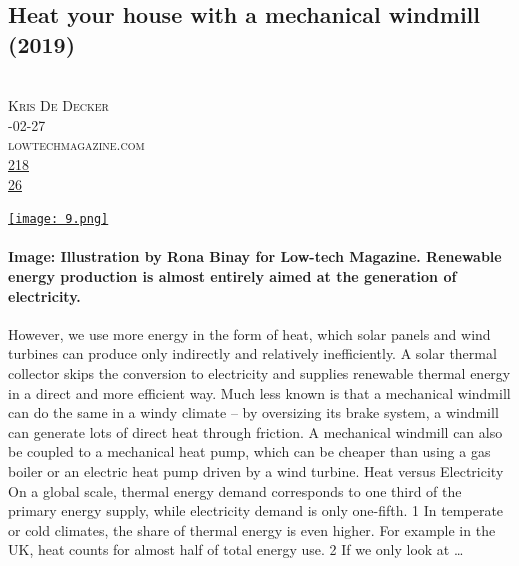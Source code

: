 \documentclass[10pt,a4paper]{article}
\begin{document}
\subsection{Heat your house with a mechanical windmill (2019)}
\noindent\begin{minipage}[t]{0.19\linewidth}
\vspace{0pt}
\noindent\scshape\footnotesize
\\ {\scriptsize\faUser}\space 
Kris De Decker
\\ {\scriptsize\faCalendar}-02-27
\\ {\scriptsize\faGlobe}\space 
lowtechmagazine.com
\\ {\scriptsize\faThumbsOUp}\space 
\href{http://news.ycombinator.com/item?id=37201688\&utm\_term=comment}{218} 
\\ {\scriptsize\faComments}\space 
\href{http://news.ycombinator.com/item?id=37201688\&utm\_term=comment}{26} 
\end{minipage} 
\begin{minipage}[t]{0.80\linewidth}
\vspace{0pt}
\begin{multicols}{2}
    \href{https://solar.lowtechmagazine.com/2019/02/heat-your-house-with-a-mechanical-windmill/?utm\_source=hackernewsletter\&utm\_medium=email\&utm\_term=fav}{
        \texttt{[image: 9.png]}
    }
\paragraph{Image: Illustration by Rona Binay for Low-tech Magazine.
Renewable energy production is almost entirely aimed at the generation of electricity.}
 However, we use more energy in the form of heat, which solar panels and wind turbines can produce only indirectly and relatively inefficiently. A solar thermal collector skips the conversion to electricity and supplies renewable thermal energy in a direct and more efficient way.
Much less known is that a mechanical windmill can do the same in a windy climate – by oversizing its brake system, a windmill can generate lots of direct heat through friction. A mechanical windmill can also be coupled to a mechanical heat pump, which can be cheaper than using a gas boiler or an electric heat pump driven by a wind turbine.
Heat versus Electricity
On a global scale, thermal energy demand corresponds to one third of the primary energy supply, while electricity demand is only one-fifth. 1 In temperate or cold climates, the share of thermal energy is even higher. For example in the UK, heat counts for almost half of total energy use. 2 If we only look at 
\dots
\end{multicols}
\end{minipage}
\par\medskip
\end{document}
